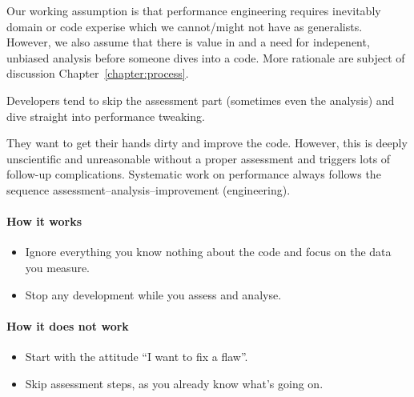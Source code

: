 \noindent
Our working assumption is that performance engineering requires inevitably domain or code experise which we cannot/might not have as generalists.
However, we also assume that there is value in and a need for indepenent, unbiased analysis before someone dives into a code.
More rationale are subject of discussion Chapter~\ref{chapter:process}.


\begin{assessmentcrime}
 Developers tend to skip the assessment part (sometimes even the analysis) and dive straight into performance tweaking.
\end{assessmentcrime} 

\noindent
They want to get their hands dirty and improve the code.
However, this is deeply unscientific and unreasonable without a proper assessment and triggers lots of follow-up complications.
Systematic work on performance always follows the sequence assessment--analysis--improvement (engineering).

\paragraph*{How it works}

\begin{itemize}[noitemsep]
  \item[$\boxplus$] Ignore everything you know nothing about the code and focus on the data you measure. 
  \item[$\boxplus$] Stop any development while you assess and analyse.
\end{itemize}


\paragraph*{How it does not work}

\begin{itemize}[noitemsep]
  \item[$\boxminus$] Start with the attitude ``I want to fix a flaw''.
  \item[$\boxminus$] Skip assessment steps, as you already know what's going on.
\end{itemize}

